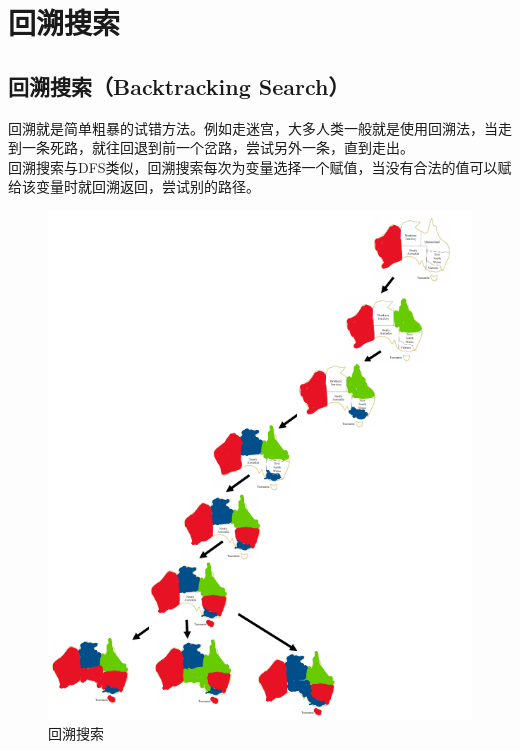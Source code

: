 \newpage

\section{回溯搜索}

\subsection{回溯搜索（Backtracking Search）}

回溯就是简单粗暴的试错方法。例如走迷宫，大多人类一般就是使用回溯法，当走到一条死路，就往回退到前一个岔路，尝试另外一条，直到走出。\\

回溯搜索与DFS类似，回溯搜索每次为变量选择一个赋值，当没有合法的值可以赋给该变量时就回溯返回，尝试别的路径。\\

\begin{figure}[H]
    \centering
    \includegraphics[scale=0.8]{img/C2/2-3/1.png}
    \caption{回溯搜索}
\end{figure}

